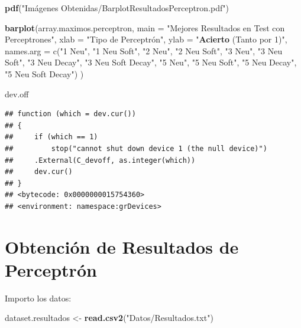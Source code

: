 \documentclass[]{article}
\newenvironment{Shaded}{\begin{snugshade}}{\end{snugshade}}
\newcommand{\KeywordTok}[1]{\textcolor[rgb]{0.13,0.29,0.53}{\textbf{#1}}}
\newcommand{\DataTypeTok}[1]{\textcolor[rgb]{0.13,0.29,0.53}{#1}}
\newcommand{\DecValTok}[1]{\textcolor[rgb]{0.00,0.00,0.81}{#1}}
\newcommand{\StringTok}[1]{\textcolor[rgb]{0.31,0.60,0.02}{#1}}
\newcommand{\NormalTok}[1]{#1}
\begin{document}
\begin{Shaded}
\begin{Highlighting}[]
\KeywordTok{pdf}\NormalTok{(}\StringTok{"Imágenes Obtenidas/BarplotResultadosPerceptron.pdf"}\NormalTok{)}

\KeywordTok{barplot}\NormalTok{(array.maximos.perceptron,}
        \DataTypeTok{main =} \StringTok{"Mejores Resultados en Test con Perceptrones"}\NormalTok{,}
        \DataTypeTok{xlab =} \StringTok{"Tipo de Perceptrón",}
\StringTok{        ylab = "}\KeywordTok{Acierto}\NormalTok{ (Tanto por }\DecValTok{1}\NormalTok{)}\StringTok{",}
\StringTok{        names.arg = c("}\DecValTok{1}\NormalTok{ Neu}\StringTok{", "}\DecValTok{1}\NormalTok{ Neu Soft}\StringTok{", }
\StringTok{                      "}\DecValTok{2}\NormalTok{ Neu}\StringTok{", "}\DecValTok{2}\NormalTok{ Neu Soft}\StringTok{", }
\StringTok{                      "}\DecValTok{3}\NormalTok{ Neu}\StringTok{", "}\DecValTok{3}\NormalTok{ Neu Soft}\StringTok{", "}\DecValTok{3}\NormalTok{ Neu Decay}\StringTok{", "}\DecValTok{3}\NormalTok{ Neu Soft Decay}\StringTok{", }
\StringTok{                      "}\DecValTok{5}\NormalTok{ Neu}\StringTok{", "}\DecValTok{5}\NormalTok{ Neu Soft}\StringTok{", "}\DecValTok{5}\NormalTok{ Neu Decay}\StringTok{", "}\DecValTok{5}\NormalTok{ Neu Soft Decay}\StringTok{")}
\StringTok{      )}

\StringTok{dev.off}
\end{Highlighting}
\end{Shaded}

\begin{verbatim}
## function (which = dev.cur()) 
## {
##     if (which == 1) 
##         stop("cannot shut down device 1 (the null device)")
##     .External(C_devoff, as.integer(which))
##     dev.cur()
## }
## <bytecode: 0x0000000015754360>
## <environment: namespace:grDevices>
\end{verbatim}

\section{Obtención de Resultados de
Perceptrón}\label{obtencion-de-resultados-de-perceptron}

Importo los datos:

\begin{Shaded}
\begin{Highlighting}[]
\NormalTok{dataset.resultados <-}\StringTok{ }\KeywordTok{read.csv2}\NormalTok{(}\StringTok{"Datos/Resultados.txt"}\NormalTok{)}
\end{Highlighting}
\end{Shaded}
\end{document}
